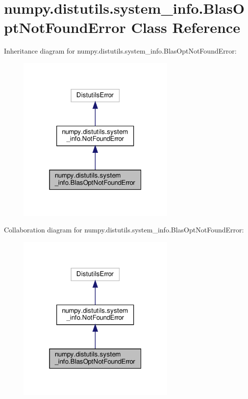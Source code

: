 \hypertarget{classnumpy_1_1distutils_1_1system__info_1_1BlasOptNotFoundError}{}\section{numpy.\+distutils.\+system\+\_\+info.\+Blas\+Opt\+Not\+Found\+Error Class Reference}
\label{classnumpy_1_1distutils_1_1system__info_1_1BlasOptNotFoundError}


Inheritance diagram for numpy.\+distutils.\+system\+\_\+info.\+Blas\+Opt\+Not\+Found\+Error\+:
\nopagebreak
\begin{figure}[H]
\begin{center}
\leavevmode
\includegraphics[width=220pt]{classnumpy_1_1distutils_1_1system__info_1_1BlasOptNotFoundError__inherit__graph}
\end{center}
\end{figure}


Collaboration diagram for numpy.\+distutils.\+system\+\_\+info.\+Blas\+Opt\+Not\+Found\+Error\+:
\nopagebreak
\begin{figure}[H]
\begin{center}
\leavevmode
\includegraphics[width=220pt]{classnumpy_1_1distutils_1_1system__info_1_1BlasOptNotFoundError__coll__graph}
\end{center}
\end{figure}


